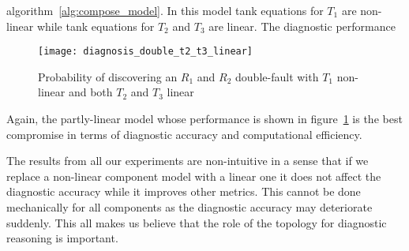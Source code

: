algorithm~\ref{alg:compose_model}. In this model tank equations for
$T_1$ are non-linear while tank equations for $T_2$ and $T_3$ are
linear. The diagnostic performance
%
\begin{figure}[htb]
  \centering
  \texttt{[image: diagnosis\_double\_t2\_t3\_linear]}
  \caption{Probability of discovering an $R_1$ and $R_2$ double-fault with $T_1$ non-linear and both $T_2$ and $T_3$ linear}
  \label{fig:diagnosis_double_t2_t3_linear}
\end{figure}
\par
%
Again, the partly-linear model whose performance is shown in
figure~\ref{fig:diagnosis_double_t2_t3_linear} is the best
compromise in terms of diagnostic accuracy and computational
efficiency.
\par
The results from all our experiments are non-intuitive in a sense that
if we replace a non-linear component model with a linear one it does
not affect the diagnostic accuracy while it improves other
metrics. This cannot be done mechanically for all components as the
diagnostic accuracy may deteriorate suddenly. This all makes us believe
that the role of the topology for diagnostic reasoning is important.
